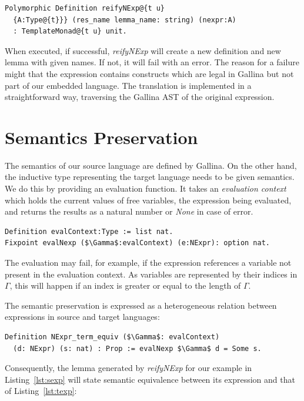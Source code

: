 \documentclass[sigplan]{acmart}\settopmatter{printfolios=true,printccs=false,printacmref=false}
\begin{document}
\begin{lstlisting}[language=Coq, mathescape=true,
  basicstyle=\footnotesize, caption=Reification program]
Polymorphic Definition reifyNExp@{t u}
  {A:Type@{t}}} (res_name lemma_name: string) (nexpr:A)
  : TemplateMonad@{t u} unit.
\end{lstlisting}

When executed, if successful, \emph{reifyNExp} will create a new
definition and new lemma with given names. If not, it will fail with an
error. The reason for a failure might that the expression contains
constructs which are legal in Gallina but not part of our embedded
language. The translation is implemented in a straightforward way,
traversing the Gallina AST of the original expression.

\section{Semantics Preservation}

The semantics of our source language are defined by Gallina. On the
other hand, the inductive type representing the target language needs
to be given semantics. We do this by providing an
evaluation function. It takes an \textit{evaluation context} which
holds the current values of free variables, the expression being
evaluated, and returns the results as a natural
number or \emph{None} in case of error.

\begin{lstlisting}[language=Coq, mathescape=true,
  basicstyle=\footnotesize]
Definition evalContext:Type := list nat.
Fixpoint evalNexp ($\Gamma$:evalContext) (e:NExpr): option nat.
\end{lstlisting}

The evaluation may fail, for example, if the expression references a
variable not present in the evaluation context. As variables are
represented by their indices in $\Gamma$, this will happen if an index is greater
or equal to the length of $\Gamma$.

The semantic preservation is expressed as a heterogeneous relation
between expressions in source and target languages:

\begin{lstlisting}[language=Coq, mathescape=true,
  basicstyle=\footnotesize]
Definition NExpr_term_equiv ($\Gamma$: evalContext)
  (d: NExpr) (s: nat) : Prop := evalNexp $\Gamma$ d = Some s.
\end{lstlisting}

Consequently, the lemma generated by \emph{reifyNExp} for our example in Listing~\ref{lst:sexp} 
will state semantic equivalence between its expression and that of Listing~\ref{lst:texp}:
\end{document}
